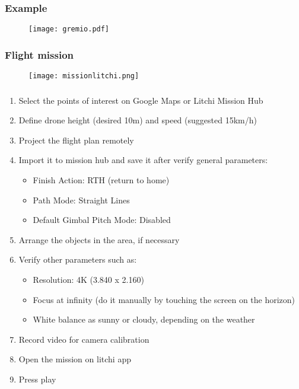 \documentclass{beamer}
\begin{document}
		\begin{frame}
			\frametitle{Example}
			\begin{figure}
				\centering
				\texttt{[image: gremio.pdf]}
			\end{figure}
		\end{frame}


		\begin{frame}
			\frametitle{Flight mission}
			\begin{figure}
				\centering
				\texttt{[image: missionlitchi.png]}
			\end{figure}
		\end{frame}


		\begin{frame}
			\frametitle{}
			\begin{enumerate}
				\item Select the points of interest on Google Maps or Litchi Mission Hub
				\item Define drone height (desired 10m) and speed (suggested 15km/h)
				\item Project the flight plan remotely
				\item Import it to mission hub and save it after verify general parameters:
				\begin{itemize}
					\item Finish Action: RTH (return to home)
					\item Path Mode: Straight Lines
					\item Default Gimbal Pitch Mode: Disabled
				\end{itemize}
				\item Arrange the objects in the area, if necessary
				\item Verify other parameters such as:
				\begin{itemize}
					\item Resolution: 4K (3.840 x 2.160)
					\item Focus at infinity (do it manually by touching the screen on the horizon)
					\item White balance as sunny or cloudy, depending on the weather
				\end{itemize}
				\item Record video for camera calibration
				\item Open the mission on litchi app
				\item Press play
			\end{enumerate}
		\end{frame}
\end{document}
